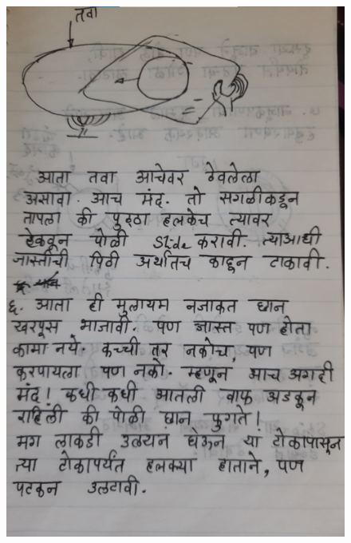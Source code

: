 \documentclass[17pt]{extarticle}  %
\begin{document}
\begin{figure}[h!]
    \centering
    \includegraphics{img/15-s.png}
\end{figure}
\end{document}
